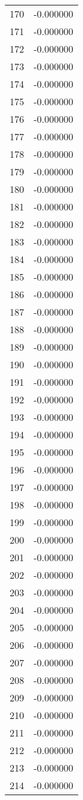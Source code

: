 \documentclass[12pt]{article}
\begin{document}
\begin{longtable}{@{}cc@{}}
170 & -0.000000 \\
171 & -0.000000 \\
172 & -0.000000 \\
173 & -0.000000 \\
174 & -0.000000 \\
175 & -0.000000 \\
176 & -0.000000 \\
177 & -0.000000 \\
178 & -0.000000 \\
179 & -0.000000 \\
180 & -0.000000 \\
181 & -0.000000 \\
182 & -0.000000 \\
183 & -0.000000 \\
184 & -0.000000 \\
185 & -0.000000 \\
186 & -0.000000 \\
187 & -0.000000 \\
188 & -0.000000 \\
189 & -0.000000 \\
190 & -0.000000 \\
191 & -0.000000 \\
192 & -0.000000 \\
193 & -0.000000 \\
194 & -0.000000 \\
195 & -0.000000 \\
196 & -0.000000 \\
197 & -0.000000 \\
198 & -0.000000 \\
199 & -0.000000 \\
200 & -0.000000 \\
201 & -0.000000 \\
202 & -0.000000 \\
203 & -0.000000 \\
204 & -0.000000 \\
205 & -0.000000 \\
206 & -0.000000 \\
207 & -0.000000 \\
208 & -0.000000 \\
209 & -0.000000 \\
210 & -0.000000 \\
211 & -0.000000 \\
212 & -0.000000 \\
213 & -0.000000 \\
214 & -0.000000 \\

\end{longtable}
\end{document}
